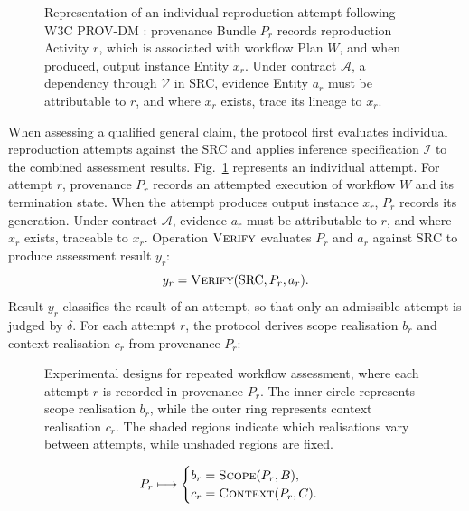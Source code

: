 \documentclass[conference,a4paper]{IEEEtran}
\newlength{\PaperStrokeWidth}
\begin{document}
  \begin{figure}[!t]
    \centering
    \AttemptAssessmentDiagram{\PaperStrokeWidth}
    \caption{Representation of an individual reproduction attempt following W3C PROV-DM \cite{w3cprovdm}: provenance Bundle $P_r$ records reproduction Activity $r$, which is associated with workflow Plan $W$, and when produced, output instance Entity $x_r$. Under contract $\mathcal A$, a dependency through $\mathcal V$ in $\mathrm{SRC}$, evidence Entity $a_r$ must be attributable to $r$, and where $x_r$ exists, trace its lineage to $x_r$.}
    \label{fig:attempt-assessment}
  \end{figure}

  When assessing a qualified general claim, the protocol first evaluates individual reproduction attempts against the SRC and applies inference specification $\mathcal I$ to the combined assessment results. Fig.~\ref{fig:attempt-assessment} represents an individual attempt. For attempt $r$, provenance $P_r$ records an attempted execution of workflow $W$ and its termination state. When the attempt produces output instance $x_r$, $P_r$ records its generation. Under contract $\mathcal A$, evidence $a_r$ must be attributable to $r$, and where $x_r$ exists, traceable to $x_r$. Operation $\operatorname{\textsc{Verify}}$ evaluates $P_r$ and $a_r$ against $\mathrm{SRC}$ to produce assessment result $y_r$:
  \begin{equation}
    y_r=\operatorname{\textsc{Verify}}(\mathrm{SRC},P_r,a_r).
    \label{eq:attempt-assessment}
  \end{equation}
  Result $y_r$ classifies the result of an attempt, so that only an admissible attempt is judged by $\delta$. For each attempt $r$, the protocol derives scope realisation $b_r$ and context realisation $c_r$ from provenance $P_r$:

  \begin{figure}[!b]
    \centering
    \ScopeContextDiagram{\PaperStrokeWidth}
    \caption{Experimental designs for repeated workflow assessment, where each attempt $r$ is recorded in provenance $P_r$. The inner circle represents scope realisation $b_r$, while the outer ring represents context realisation $c_r$. The shaded regions indicate which realisations vary between attempts, while unshaded regions are fixed.}
    \label{fig:scope-context}
  \end{figure}

  \begin{equation}
    P_r \longmapsto
    \begin{cases}
      b_r=\operatorname{\textsc{Scope}}(P_r,B),\\
      c_r=\operatorname{\textsc{Context}}(P_r,C).
    \end{cases}
    \label{eq:attempt-realizations}
  \end{equation}
\end{document}
